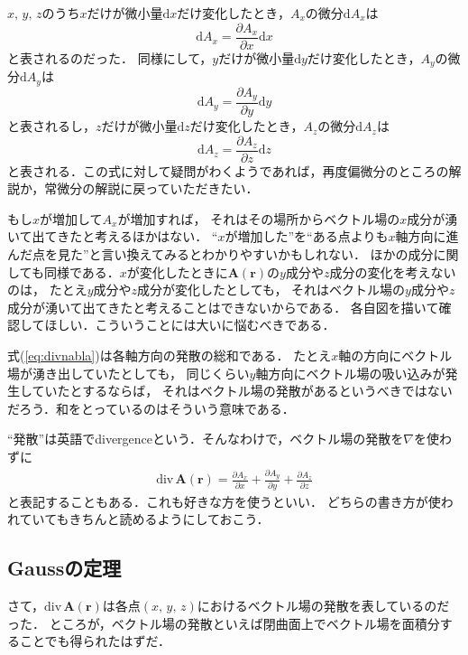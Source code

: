 $x, \, y, \, z$のうち$x$だけが微小量$\mathrm{d}x$だけ変化したとき，$A_x$の微分$\mathrm{d} A_x$は
$$
\mathrm{d} A_x = \frac{\partial A_x}{\partial x} \mathrm{d}x
$$
と表されるのだった．
同様にして，$y$だけが微小量$\mathrm{d}y$だけ変化したとき，$A_y$の微分$\mathrm{d} A_y$は
$$
\mathrm{d} A_y = \frac{\partial A_y}{\partial y} \mathrm{d}y
$$
と表されるし，$z$だけが微小量$\mathrm{d}z$だけ変化したとき，$A_z$の微分$\mathrm{d} A_z$は
$$
\mathrm{d} A_z = \frac{\partial A_z}{\partial z} \mathrm{d}z
$$
と表される．この式に対して疑問がわくようであれば，再度偏微分のところの解説か，常微分の解説に戻っていただきたい．

もし$x$が増加して$A_x$が増加すれば，
それはその場所からベクトル場の$x$成分が湧いて出てきたと考えるほかはない．
``$x$が増加した''を``ある点よりも$x$軸方向に進んだ点を見た''と言い換えてみるとわかりやすいかもしれない．
ほかの成分に関しても同様である．$x$が変化したときに$\bm{A}(\bm{r})$の$y$成分や$z$成分の変化を考えないのは，
たとえ$y$成分や$z$成分が変化したとしても，
それはベクトル場の$y$成分や$z$成分が湧いて出てきたと考えることはできないからである．
各自図を描いて確認してほしい．こういうことには大いに悩むべきである．

式(\ref{eq:divnabla})は各軸方向の発散の総和である．
たとえ$x$軸の方向にベクトル場が湧き出していたとしても，
同じくらい$y$軸方向にベクトル場の吸い込みが発生していたとするならば，
それはベクトル場の発散があるというべきではないだろう．和をとっているのはそういう意味である．

``発散''は英語でdivergenceという．そんなわけで，ベクトル場の発散を$\nabla$を使わずに
\begin{eqnarray}
\mathrm{div} \, \bm{A}(\bm{r}) = \frac{\partial A_x}{\partial x} + \frac{\partial A_y}{\partial y} +  \frac{\partial A_z}{\partial z}
\label{eq:divdiv}
\end{eqnarray}
と表記することもある．これも好きな方を使うといい．
どちらの書き方が使われていてもきちんと読めるようにしておこう．

\subsection{\textrm{Gauss}の定理}
さて，$\mathrm{div} \, \bm{A}(\bm{r})$は各点$(x, \, y, \, z)$におけるベクトル場の発散を表しているのだった．
ところが，ベクトル場の発散といえば閉曲面上でベクトル場を面積分することでも得られたはずだ．


